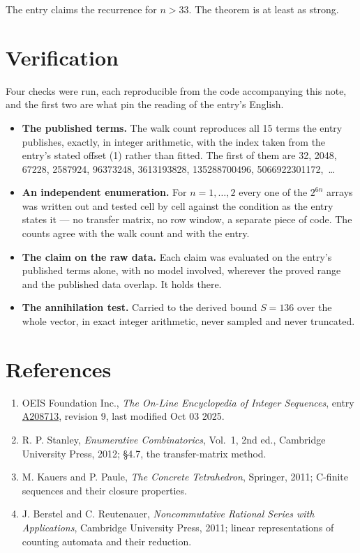 \documentclass[11pt]{article}
\theoremstyle{definition}
\begin{document}
The entry claims the recurrence for $n > 33$. The theorem is at least as strong.

\section{Verification}

Four checks were run, each reproducible from the code accompanying this note, and the first two are what pin the reading of the entry's English.

\begin{itemize}

\item {\bfseries The published terms.} The walk count reproduces all 15 terms the entry publishes, exactly, in integer arithmetic, with the index taken from the entry's stated offset (1) rather than fitted. The first of them are 32, 2048, 67228, 2587924, 96373248, 3613193828, 135288700496, 5066922301172,~\dots

\item {\bfseries An independent enumeration.} For $n = 1,\dots,2$ every one of the $2^{6n}$ arrays was written out and tested cell by cell against the condition as the entry states it --- no transfer matrix, no row window, a separate piece of code. The counts agree with the walk count and with the entry.

\item {\bfseries The claim on the raw data.} Each claim was evaluated on the entry's published terms alone, with no model involved, wherever the proved range and the published data overlap. It holds there.

\item {\bfseries The annihilation test.} Carried to the derived bound $S = 136$ over the whole vector, in exact integer arithmetic, never sampled and never truncated.

\end{itemize}

\section{References}

\begin{enumerate}

\item OEIS Foundation Inc., \emph{The On-Line Encyclopedia of Integer Sequences}, entry \href{https://oeis.org/A208713}{A208713}, revision 9, last modified Oct 03 2025.

\item R. P. Stanley, \emph{Enumerative Combinatorics}, Vol.~1, 2nd ed., Cambridge University Press, 2012; \S4.7, the transfer-matrix method.

\item M. Kauers and P. Paule, \emph{The Concrete Tetrahedron}, Springer, 2011; C-finite sequences and their closure properties.

\item J. Berstel and C. Reutenauer, \emph{Noncommutative Rational Series with Applications}, Cambridge University Press, 2011; linear representations of counting automata and their reduction.

\end{enumerate}
\end{document}
